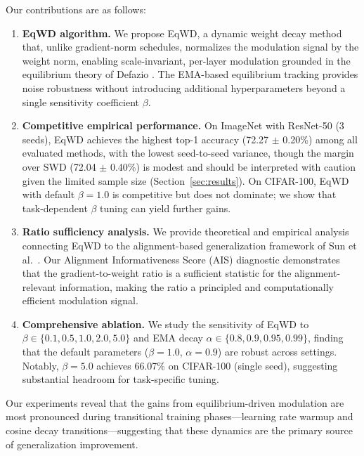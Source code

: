 \documentclass{article}
\begin{document}
Our contributions are as follows:

\begin{enumerate}
\item
  \textbf{EqWD algorithm.} We propose EqWD, a dynamic weight decay
  method that, unlike gradient-norm schedules, normalizes the modulation
  signal by the weight norm, enabling scale-invariant, per-layer
  modulation grounded in the equilibrium theory of Defazio
  \citep{defazio2025}. The EMA-based equilibrium tracking provides noise
  robustness without introducing additional hyperparameters beyond a
  single sensitivity coefficient $\beta$.
\item
  \textbf{Competitive empirical performance.} On ImageNet with ResNet-50
  (3 seeds), EqWD achieves
  the highest top-1 accuracy (72.27 $\pm$ 0.20\%) among all evaluated
  methods, with the lowest seed-to-seed variance, though the margin over
  SWD (72.04 $\pm$ 0.40\%) is modest and should be interpreted with
  caution given the limited sample size (Section~\ref{sec:results}). On CIFAR-100,
  EqWD with default $\beta = 1.0$ is competitive but does not
  dominate; we show that task-dependent $\beta$ tuning can yield
  further gains.
\item
  \textbf{Ratio sufficiency analysis.} We provide theoretical and
  empirical analysis connecting EqWD to the alignment-based
  generalization framework of Sun et al.~\citep{sun2025cvpr}. Our
  Alignment Informativeness Score (AIS) diagnostic demonstrates that the
  gradient-to-weight ratio is a sufficient statistic for the
  alignment-relevant information, making the ratio a principled and
  computationally efficient modulation signal.
\item
  \textbf{Comprehensive ablation.} We study the sensitivity of EqWD to
  $\beta \in \{0.1, 0.5, 1.0, 2.0, 5.0\}$ and EMA decay
  $\alpha \in \{0.8, 0.9, 0.95, 0.99\}$, finding that the default
  parameters ($\beta = 1.0$, $\alpha = 0.9$) are robust across
  settings. Notably, $\beta = 5.0$ achieves 66.07\% on CIFAR-100
  (single seed), suggesting substantial headroom for task-specific
  tuning.
\end{enumerate}

Our experiments reveal that the gains from equilibrium-driven modulation
are most pronounced during transitional training phases---learning rate
warmup and cosine decay transitions---suggesting that these dynamics are
the primary source of generalization improvement.


\end{document}
